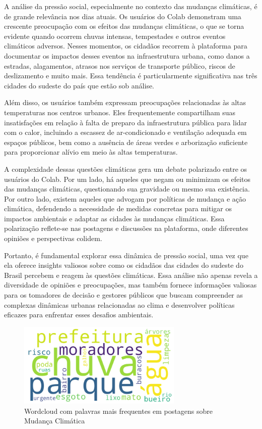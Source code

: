 A análise da pressão social, especialmente no contexto das mudanças climáticas, é de grande relevância nos dias atuais. Os usuários do Colab demonstram uma crescente preocupação com os efeitos das mudanças climáticas, o que se torna evidente quando ocorrem chuvas intensas, tempestades e outros eventos climáticos adversos. Nesses momentos, os cidadãos recorrem à plataforma para documentar os impactos desses eventos na infraestrutura urbana, como danos a estradas, alagamentos, atrasos nos serviços de transporte público, riscos de deslizamento e muito mais. Essa tendência é particularmente significativa nas três cidades do sudeste do país que estão sob análise.

Além disso, os usuários também expressam preocupações relacionadas às altas temperaturas nos centros urbanos. Eles frequentemente compartilham suas insatisfações em relação à falta de preparo da infraestrutura pública para lidar com o calor, incluindo a escassez de ar-condicionado e ventilação adequada em espaços públicos, bem como a ausência de áreas verdes e arborização suficiente para proporcionar alívio em meio às altas temperaturas.

A complexidade dessas questões climáticas gera um debate polarizado entre os usuários do Colab. Por um lado, há aqueles que negam ou minimizam os efeitos das mudanças climáticas, questionando sua gravidade ou mesmo sua existência. Por outro lado, existem aqueles que advogam por políticas de mudança e ação climática, defendendo a necessidade de medidas concretas para mitigar os impactos ambientais e adaptar as cidades às mudanças climáticas. Essa polarização reflete-se nas postagens e discussões na plataforma, onde diferentes opiniões e perspectivas colidem.

Portanto, é fundamental explorar essa dinâmica de pressão social, uma vez que ela oferece insights valiosos sobre como os cidadãos das cidades do sudeste do Brasil percebem e reagem às questões climáticas. Essa análise não apenas revela a diversidade de opiniões e preocupações, mas também fornece informações valiosas para os tomadores de decisão e gestores públicos que buscam compreender as complexas dinâmicas urbanas relacionadas ao clima e desenvolver políticas eficazes para enfrentar esses desafios ambientais.

\begin{figure}[htb]
	\centering
	\includegraphics[width=0.7\textwidth]{images/wordcloud_weather.png}
	\caption{Wordcloud com palavras mais frequentes em postagens sobre Mudança Climática}
	\label{fig:wordcloud_weather}
\end{figure}

